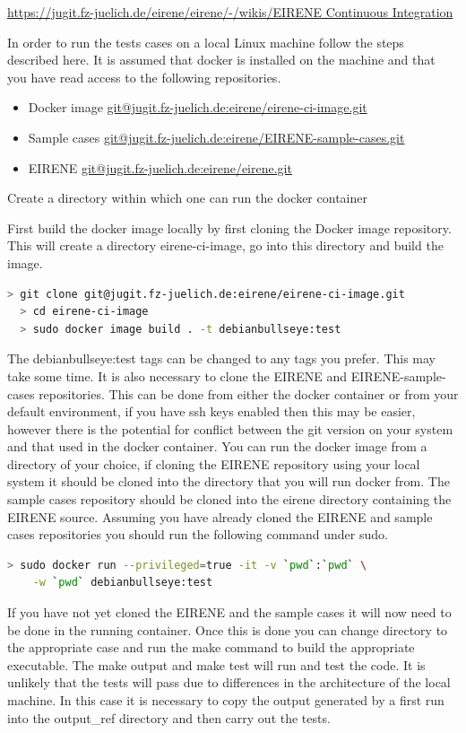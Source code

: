 \url{https://jugit.fz-juelich.de/eirene/eirene/-/wikis/EIRENE Continuous Integration}

In order to run the tests cases on a local Linux machine follow the steps described here. It is assumed that docker is installed on the machine and that you have read access to the following repositories.

\begin{itemize}
\item Docker image \url{git@jugit.fz-juelich.de:eirene/eirene-ci-image.git}
\item Sample cases \url{git@jugit.fz-juelich.de:eirene/EIRENE-sample-cases.git}
\item EIRENE \url{git@jugit.fz-juelich.de:eirene/eirene.git}
\end{itemize}

Create a directory within which one can run the docker container

First build the docker image locally by first cloning the Docker image repository. This will create a directory eirene-ci-image, go into this directory and build the image.

\begin{lstlisting}[language=bash,columns=fullflexible]
  > git clone git@jugit.fz-juelich.de:eirene/eirene-ci-image.git
  > cd eirene-ci-image
  > sudo docker image build . -t debianbullseye:test
\end{lstlisting}

The {debianbullseye:test} tags can be changed to any tags you prefer. This may take some time. It is also necessary to clone the EIRENE and EIRENE-sample-cases repositories. This can be done from either the docker container or from your default environment, if you have ssh keys enabled then this may be easier,  however there is the potential for conflict between the git version on your system and that used in the docker container. You can run the docker image from a directory of your choice, if cloning the EIRENE repository using your local system it should be cloned into the directory that you will run docker from. The sample cases repository should be cloned into the {eirene} directory containing the EIRENE source. Assuming you have already cloned the EIRENE and sample cases repositories you should run the following command under sudo.

\begin{lstlisting}[language=bash,columns=fullflexible]
  > sudo docker run --privileged=true -it -v `pwd`:`pwd` \
    -w `pwd` debianbullseye:test
\end{lstlisting}

If you have not yet cloned the EIRENE and the sample cases it will now need to be done in the running container. Once this is done you can change directory to the appropriate case and run the {make} command to build the appropriate executable. The {make output} and {make test} will run and test the code. It is unlikely that the tests will pass due to differences in the architecture of the local machine. In this case it is necessary to copy the output generated by a first run into the {output\_ref} directory and then carry out the tests.

